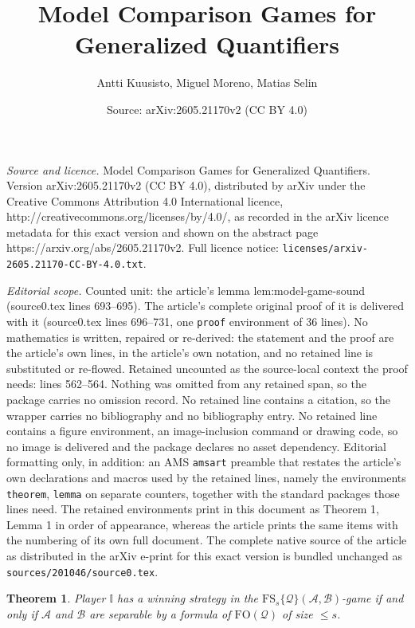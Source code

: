 \documentclass[10pt,a4paper]{amsart}
\title{Model Comparison Games for Generalized Quantifiers}
\author{Antti Kuusisto, Miguel Moreno, Matias Selin}
\date{Source: arXiv:2605.21170v2 (CC BY 4.0)}
\newtheorem{theorem}{Theorem}
\begin{document}
\maketitle

\noindent\emph{Source and licence.} Model Comparison Games for Generalized Quantifiers. Version arXiv:2605.21170v2 (CC BY 4.0), distributed by arXiv under the Creative Commons Attribution 4.0 International licence, http://creativecommons.org/licenses/by/4.0/, as recorded in the arXiv licence metadata for this exact version and shown on the abstract page https://arxiv.org/abs/2605.21170v2. Full licence notice: \texttt{licenses/arxiv-2605.21170-CC-BY-4.0.txt}.\par\smallskip

\noindent\textit{Editorial scope.} Counted unit: the article's lemma lem:model-game-sound (source0.tex lines 693--695). The article's complete original proof of it is delivered with it (source0.tex lines 696--731, one \texttt{proof} environment of 36 lines). No mathematics is written, repaired or re-derived: the statement and the proof are the article's own lines, in the article's own notation, and no retained line is substituted or re-flowed.  Retained uncounted as the source-local context the proof needs: lines 562--564.  Nothing was omitted from any retained span, so the package carries no omission record.  No retained line contains a citation, so the wrapper carries no bibliography and no bibliography entry.  No retained line contains a figure environment, an image-inclusion command or drawing code, so no image is delivered and the package declares no asset dependency.  Editorial formatting only, in addition: an AMS \texttt{amsart} preamble that restates the article's own declarations and macros used by the retained lines, namely the environments \texttt{theorem}, \texttt{lemma} on separate counters, together with the standard packages those lines need.  The retained environments print in this document as Theorem 1, Lemma 1 in order of appearance, whereas the article prints the same items with the numbering of its own full document.  The complete native source of the article as distributed in the arXiv e-print for this exact version is bundled unchanged as \texttt{sources/201046/source0.tex}.
\begin{theorem}\label{thm:width-game}
    Player $\mathbb{I}$ has a winning strategy in the $\mathrm{FS}_s\{\mathcal{Q}\}(\mathcal{A},\mathcal{B})$-game if and only if $\mathcal{A}$ and $\mathcal{B}$ are separable by a formula of $\mathrm{FO}(\mathcal{Q})$ of size $\leq s$.
\end{theorem}
\end{document}
